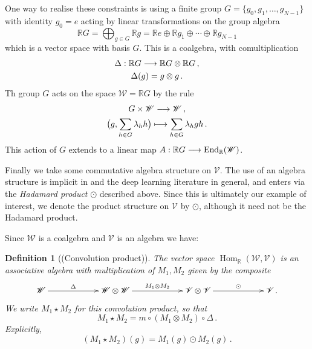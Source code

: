 \documentclass[english,letter paper,12pt,leqno]{article}
\theoremstyle{example}
\newtheorem{definition}[theorem]{Definition}
\numberwithin{equation}{section}
\def\Hom{\operatorname{Hom}}
\DeclareMathOperator{\End}{End}
\begin{document}
One way to realise these constraints is using a finite group $G = \{ g_0, g_1,\ldots, g_{N-1}\}$ with identity $g_0 = e$ acting by linear transformations on the group algebra
\[
\mathbb{R} G = \bigoplus_{g \in G} \mathbb{R} g = \mathbb{R} e \oplus \mathbb{R} g_1 \oplus \cdots \oplus \mathbb{R} g_{N-1}
\]
which is a vector space with basis $G$. This is a coalgebra, with comultiplication
\begin{gather*}
\Delta: \mathbb{R} G \longrightarrow \mathbb{R} G \otimes \mathbb{R} G\,,\\
\Delta(g) = g \otimes g\,.
\end{gather*}
Th group $G$ acts on the space $\mathscr{W} = \mathbb{R} G$ by the rule
\begin{gather*}
G \times \mathscr{W} \longrightarrow \mathscr{W}\,,\\
\big(g, \sum_{h \in G} \lambda_h h \big) \longmapsto \sum_{h \in G} \lambda_h gh\,.
\end{gather*}
This action of $G$ extends to a linear map $A: \mathbb{R} G \lto \End_{\mathbb{R}}(\mathscr{W})$.

Finally we take some commutative algebra structure on $\mathscr{V}$. The use of an algebra structure is implicit in \cite{ntm} and the deep learning literature in general, and enters via the \emph{Hadamard product} $\odot$ described above. Since this is ultimately our example of interest, we denote the product structure on $\mathscr{V}$ by $\odot$, although it need not be the Hadamard product.

Since $\mathscr{W}$ is a coalgebra and $\mathscr{V}$ is an algebra we have:

\begin{definition}[(Convolution product)] The vector space $\Hom_{\mathbb{R}}(\mathscr{W}, \mathscr{V})$ is an associative algebra with multiplication of $M_1, M_2$ given by the composite
\[
\xymatrix@C+3pc{
\mathscr{W} \ar[r]^-{\Delta} & \mathscr{W} \otimes \mathscr{W} \ar[r]^-{M_1 \otimes M_2} & \mathscr{V} \otimes \mathscr{V} \ar[r]^-{\odot} & \mathscr{V}\,.
}
\]
We write $M_1 \star M_2$ for this \emph{convolution product}, so that
\[
M_1 \star M_2 = m \circ (M_1 \otimes M_2) \circ \Delta\,.
\]
Explicitly,
\[
(M_1 \star M_2)(g) = M_1(g) \odot M_2(g)\,.
\]
\end{definition}
\end{document}
